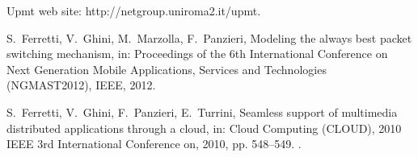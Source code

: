 \documentclass[preprint,12pt]{elsarticle}
\begin{document}
\begin{thebibliography}{10}
Upmt web site: http://netgroup.uniroma2.it/upmt.

S.~Ferretti, V.~Ghini, M.~Marzolla, F.~Panzieri, Modeling the always best
  packet switching mechanism, in: Proceedings of the 6th International
  Conference on Next Generation Mobile Applications, Services and Technologies
  (NGMAST2012), IEEE, 2012.

S.~Ferretti, V.~Ghini, F.~Panzieri, E.~Turrini, Seamless support of multimedia
  distributed applications through a cloud, in: Cloud Computing (CLOUD), 2010
  IEEE 3rd International Conference on, 2010, pp. 548--549.
\newblock \href {http://dx.doi.org/10.1109/CLOUD.2010.16}
  {}.

\end{thebibliography}
\end{document}
